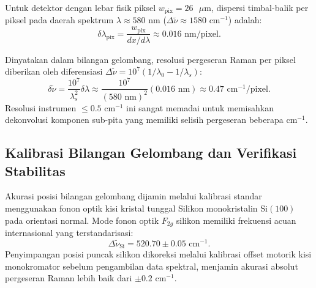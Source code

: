 Untuk detektor dengan lebar fisik piksel $w_{\mathrm{pix}} = 26\text{ }\mu\text{m}$, dispersi timbal-balik per piksel pada daerah spektrum $\lambda \approx 580\text{ nm}$ ($\Delta\tilde{\nu} \approx 1580\text{ cm}^{-1}$) adalah:
\begin{equation}
\delta\lambda_{\mathrm{pix}} = \frac{w_{\mathrm{pix}}}{dx/d\lambda} \approx 0.016\text{ nm/pixel}.
\end{equation}

Dinyatakan dalam bilangan gelombang, resolusi pergeseran Raman per piksel diberikan oleh diferensiasi $\Delta\tilde{\nu} = 10^7 (1/\lambda_0 - 1/\lambda_s)$:
\begin{equation}
\delta\tilde{\nu} = \frac{10^7}{\lambda_s^2} \delta\lambda \approx \frac{10^7}{(580\text{ nm})^2} (0.016\text{ nm}) \approx 0.47\text{ cm}^{-1}/\text{pixel}.
\label{eq:resolusi_spektral}
\end{equation}
Resolusi instrumen $\le 0.5\text{ cm}^{-1}$ ini sangat memadai untuk memisahkan dekonvolusi komponen sub-pita yang memiliki selisih pergeseran beberapa $\text{cm}^{-1}$.

\subsection{Kalibrasi Bilangan Gelombang dan Verifikasi Stabilitas}
Akurasi posisi bilangan gelombang dijamin melalui kalibrasi standar menggunakan fonon optik kisi kristal tunggal Silikon monokristalin $\text{Si}(100)$ pada orientasi normal. Mode fonon optik $F_{2g}$ silikon memiliki frekuensi acuan internasional yang terstandarisasi:
\begin{equation}
\Delta\tilde{\nu}_{\mathrm{Si}} = 520.70 \pm 0.05\text{ cm}^{-1}.
\label{eq:kalibrasi_silikon}
\end{equation}
Penyimpangan posisi puncak silikon dikoreksi melalui kalibrasi offset motorik kisi monokromator sebelum pengambilan data spektral, menjamin akurasi absolut pergeseran Raman lebih baik dari $\pm 0.2\text{ cm}^{-1}$.

